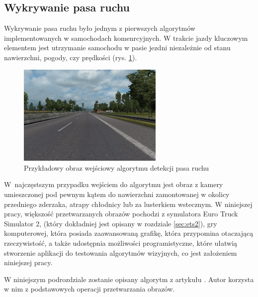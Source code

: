 \subsection{Wykrywanie pasa ruchu}

\label{sec:lane_detection}

Wykrywanie pasa ruchu było jednym z pierwszych algorytmów implementowanych w samochodach komenrcyjnych. %
W trakcie jazdy kluczowym elementem jest utrzymanie samochodu w pasie jezdni niezależnie od stanu nawierzchni, pogody, czy prędkości (rys. \ref{fig:inputimg1}).

\begin{figure}
  \centering
  \includegraphics[width=7cm]{img/input.png}
  \caption{Przykładowy obraz wejściowy algorytmu detekcji pasa ruchu}
  \label{fig:inputimg1}
  \end{figure}

W~najczęstszym przypadku wejściem do algorytmu jest obraz z kamery umieszczonej pod pewnym kątem do nawierzchni zamontowanej w okolicy przedniego zderzaka, atrapy chłodnicy lub za lusterkiem wstecznym. %
W niniejszej pracy, większość przetwarzanych obrazów pochodzi z symulatora Euro Truck Simulator 2, (który dokładniej jest opisany w rozdziale \ref{sec:ets2}), gry komputerowej, która posiada zaawansowaną grafikę, która przypomina otaczającą rzeczywistość, a także udostępnia możliwości programistyczne, które ułatwią stworzenie aplikacji do testowania algorytmów wizyjnych, co jest założeniem niniejszej pracy. %

W niniejszym podrozdziale zostanie opisany algorytm z artykułu \cite{T3}. %
Autor korzysta w nim z podstawowych operacji przetwarzania obrazów. 



